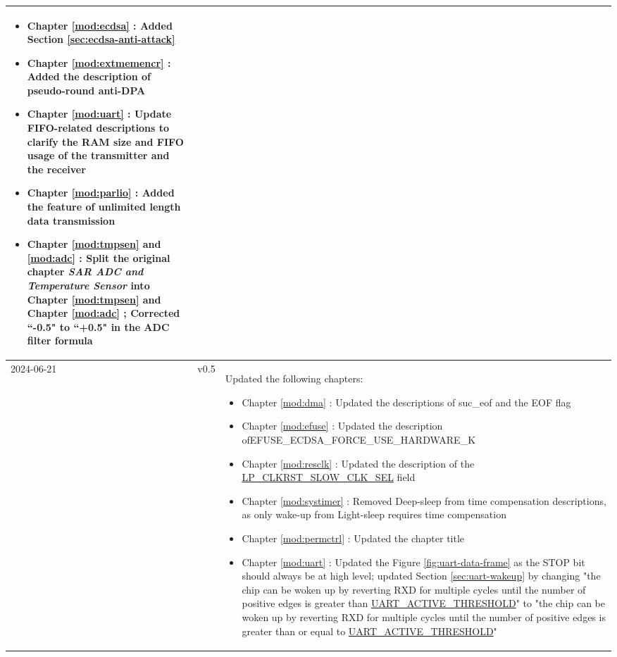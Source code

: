 \begin{longtable}[l]{ | m{2cm} | m{1.5cm} | m{12cm} | }
\begin{itemize}
        \item Chapter \ref{mod:ecdsa} \nameref{mod:ecdsa}: Added Section \ref{sec:ecdsa-anti-attack} \textit{\nameref{sec:ecdsa-anti-attack}} %
        \item Chapter \ref{mod:extmemencr} \textit{\nameref{mod:extmemencr}}: Added the description of pseudo-round anti-DPA %
        \item Chapter \ref{mod:uart} \textit{\nameref{mod:uart}}: Update FIFO-related descriptions to clarify the RAM size and FIFO usage of the transmitter and the receiver %
        \item Chapter \ref{mod:parlio} \textit{\nameref{mod:parlio}}: Added the feature of unlimited length data transmission %
        \item Chapter \ref{mod:tmpsen} \textit{\nameref{mod:tmpsen}} and \ref{mod:adc} \textit{\nameref{mod:adc}}: Split the original chapter \textit{SAR ADC and Temperature Sensor} into Chapter \ref{mod:tmpsen} \textit{\nameref{mod:tmpsen}} and Chapter \ref{mod:adc} \textit{\nameref{mod:adc}}; Corrected ``-0.5" to ``+0.5" in the ADC filter formula %
    \end{itemize}
    \\\hline
    2024-06-21 & v0.5 &
    Updated the following chapters:
    \begin{itemize}
        \item Chapter \ref{mod:dma} \textit{\nameref{mod:dma}}: Updated the descriptions of suc\_eof and the EOF flag %
        \item Chapter \ref{mod:efuse} \textit{\nameref{mod:efuse}}: Updated the description ofEFUSE\_ECDSA\_FORCE\_USE\_HARDWARE\_K
        \item Chapter \ref{mod:resclk} \textit{\nameref{mod:resclk}}: Updated the description of the \hyperref[fielddesc:LPCLKRSTSLOWCLKSEL]{LP\_CLKRST\_SLOW\_CLK\_SEL} field
        \item Chapter \ref{mod:systimer} \textit{\nameref{mod:systimer}}: Removed Deep-sleep from time compensation descriptions, as only wake-up from Light-sleep requires time compensation %
        \item Chapter \ref{mod:permctrl} \textit{\nameref{mod:permctrl}}: Updated the chapter title
        \item Chapter \ref{mod:uart} \textit{\nameref{mod:uart}}: Updated the Figure \ref{fig:uart-data-frame} \textit{\nameref{fig:uart-data-frame}} as the STOP bit should always be at high level; updated Section \ref{sec:uart-wakeup} by changing "the chip can be woken up by reverting RXD for multiple cycles until the number of positive edges is greater than \hyperref[fielddesc:UARTACTIVETHRESHOLD]{UART\_ACTIVE\_THRESHOLD}" to "the chip can be woken up by reverting RXD for multiple cycles until the number of positive edges is greater than or equal to \hyperref[fielddesc:UARTACTIVETHRESHOLD]{UART\_ACTIVE\_THRESHOLD}" %

\end{itemize}
\end{longtable}
